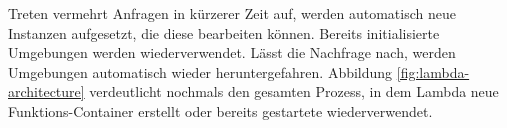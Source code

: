 Treten vermehrt Anfragen in kürzerer Zeit auf, werden automatisch neue Instanzen aufgesetzt, die diese bearbeiten können. Bereits initialisierte Umgebungen werden wiederverwendet. Lässt die Nachfrage nach, werden Umgebungen automatisch wieder heruntergefahren. Abbildung \ref{fig:lambda-architecture} verdeutlicht nochmals den gesamten Prozess, in dem Lambda neue Funktions-Container erstellt oder bereits gestartete wiederverwendet.